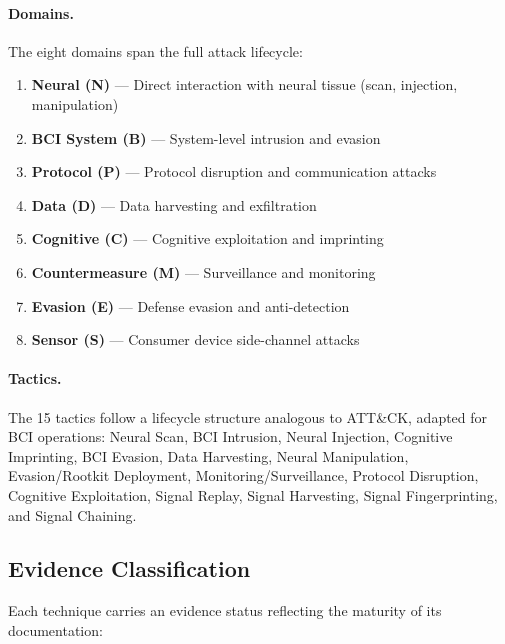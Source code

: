 \paragraph{Domains.}
The eight domains span the full attack lifecycle:

\begin{enumerate}
  \item \textbf{Neural (N)} --- Direct interaction with neural tissue
        (scan, injection, manipulation)
  \item \textbf{BCI System (B)} --- System-level intrusion and evasion
  \item \textbf{Protocol (P)} --- Protocol disruption and communication attacks
  \item \textbf{Data (D)} --- Data harvesting and exfiltration
  \item \textbf{Cognitive (C)} --- Cognitive exploitation and imprinting
  \item \textbf{Countermeasure (M)} --- Surveillance and monitoring
  \item \textbf{Evasion (E)} --- Defense evasion and anti-detection
  \item \textbf{Sensor (S)} --- Consumer device side-channel attacks
\end{enumerate}

\paragraph{Tactics.}
The 15 tactics follow a lifecycle structure analogous to ATT\&CK, adapted for BCI operations:
Neural Scan, BCI Intrusion, Neural Injection, Cognitive Imprinting, BCI Evasion,
Data Harvesting, Neural Manipulation, Evasion/Rootkit Deployment, Monitoring/Surveillance,
Protocol Disruption, Cognitive Exploitation, Signal Replay, Signal Harvesting,
Signal Fingerprinting, and Signal Chaining.

\subsection{Evidence Classification}

Each technique carries an evidence status reflecting the maturity of its
documentation:

